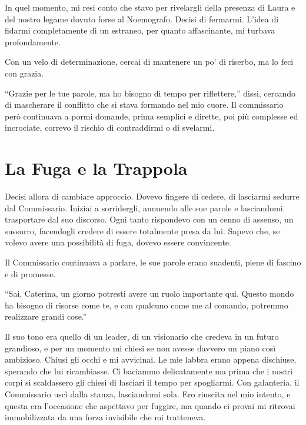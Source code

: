 In quel momento, mi resi conto che stavo per rivelargli della presenza di Laura e del nostro legame dovuto forse al Noemografo. Decisi di fermarmi. L'idea di fidarmi completamente di un estraneo, per quanto affascinante, mi turbava profondamente.

Con un velo di determinazione, cercai di mantenere un po' di riserbo, ma lo feci con grazia.

\begin{dialogue}
 \enquote{Grazie per le tue parole, ma ho bisogno di tempo per riflettere,} dissi, cercando di mascherare il conflitto che si stava formando nel mio cuore. Il commissario però continuava a pormi domande, prima semplici e dirette, poi più complesse ed incrociate, correvo il rischio di contraddirmi o di svelarmi.
\end{dialogue}

\section{La Fuga e la Trappola}

Decisi allora di cambiare approccio. Dovevo fingere di cedere, di lasciarmi sedurre dal Commissario. Iniziai a sorridergli, annuendo alle sue parole e lasciandomi trasportare dal suo discorso. Ogni tanto rispondevo con un cenno di assenso, un sussurro, facendogli credere di essere totalmente presa da lui. Sapevo che, se volevo avere una possibilità di fuga, dovevo essere convincente.

Il Commissario continuava a parlare, le sue parole erano suadenti, piene di fascino e di promesse.

\begin{dialogue}
 \enquote{Sai, Caterina, un giorno potresti avere un ruolo importante qui. Questo mondo ha bisogno di risorse come te, e con qualcuno come me al comando, potremmo realizzare grandi cose.}
\end{dialogue}

Il suo tono era quello di un leader, di un visionario che credeva in un futuro grandioso, e per un momento mi chiesi se non avesse davvero un piano così ambizioso.
Chiusi gli occhi e mi avvicinai. Le mie labbra erano appena dischiuse, sperando che lui ricambiasse. Ci baciammo delicatamente ma prima che i nostri corpi si scaldassero gli chiesi di lasciari il tempo per spogliarmi. Con galanteria, il Commissario uscì dalla stanza, lasciandomi sola. Ero riuscita nel mio intento, e questa era l'occasione che aspettavo per fuggire,  ma quando ci provai  mi ritrovai immobilizzata da una forza invisibile che mi tratteneva.

